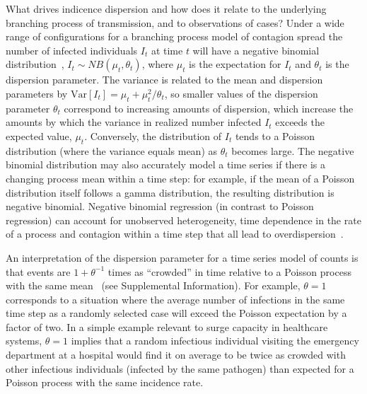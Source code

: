 \documentclass[11pt,letterpaper]{article}
\begin{document}
What drives indicence dispersion and how does it relate to the underlying branching process of transmission, and to observations of cases? 
Under a wide range of configurations for a branching process model of contagion spread the number of infected individuals $I_t$ at time $t$ will have a negative binomial distribution~\citep{kendall1949stochastic, grenfell2002dynamics}, $I_t \sim NB \left( \mu_t, \theta_t \right)$, where $\mu_t$ is the expectation for $I_t$ and $\theta_t$ is the dispersion parameter. 
The variance is related to the mean and dispersion parameters by $\mathrm{Var}[I_t] = \mu_t + \mu_t^2 / \theta_t$, so smaller values of the dispersion parameter $\theta_t$ correspond to increasing amounts of dispersion, which increase the amounts by which the variance in realized number infected $I_t$ exceeds the expected value, $\mu_t$. 
Conversely, the distribution of $I_t$ tends to a Poisson distribution (where the variance equals mean) as $\theta_t$ becomes large. 
The negative binomial distribution may also accurately model a time series if there is a changing process mean within a time step: for example, if the mean of a Poisson distribution itself follows a gamma distribution, the resulting distribution is negative binomial. 
Negative binomial regression (in contrast to Poisson regression) can account for unobserved heterogeneity, time dependence in the rate of a process and contagion within a time step that all lead to overdispersion~\citep{barron1992analysis}.

An interpretation of the dispersion parameter for a time series model of counts is that events are $1 + \theta^{-1}$ times as ``crowded'' in time relative to a Poisson process with the same mean~\citep{lloyd1967mean} (see Supplemental Information). 
For example, $\theta = 1$ corresponds to a situation where the average number of infections in the same time step as a randomly selected case will exceed the Poisson expectation by a factor of two. 
In a simple example relevant to surge capacity in healthcare systems, $\theta = 1$ implies that a random infectious individual visiting the emergency department at a hospital would find it on average to be twice as crowded with other infectious individuals (infected by the same pathogen) than expected for a Poisson process with the same incidence rate.
\end{document}
